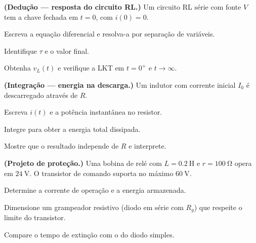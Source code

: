 \blocodesafio
\begin{questao}[4]{}

\textbf{(Dedução --- resposta do circuito RL.)} Um circuito RL série com fonte
$V$ tem a chave fechada em $t=0$, com $i(0)=0$.
\begin{itensq}
\item Escreva a equação diferencial e resolva-a por separação de variáveis.
\item Identifique $\tau$ e o valor final.
\item Obtenha $v_L(t)$ e verifique a LKT em $t=0^{+}$ e $t\to\infty$.
\end{itensq}


\end{questao}
\begin{questao}[4]{}

\textbf{(Integração --- energia na descarga.)} Um indutor com corrente inicial
$I_0$ é descarregado através de $R$.
\begin{itensq}
\item Escreva $i(t)$ e a potência instantânea no resistor.
\item Integre para obter a energia total dissipada.
\item Mostre que o resultado independe de $R$ e interprete.
\end{itensq}


\end{questao}
\begin{questao}[4]{}

\textbf{(Projeto de proteção.)} Uma bobina de relé com $L=\SI{0.2}{\henry}$ e
$r=\SI{100}{\ohm}$ opera em $\SI{24}{\volt}$. O transistor de comando suporta
no máximo $\SI{60}{\volt}$.
\begin{itensq}
\item Determine a corrente de operação e a energia armazenada.
\item Dimensione um grampeador resistivo (diodo em série com $R_g$) que
      respeite o limite do transistor.
\item Compare o tempo de extinção com o do diodo simples.
\end{itensq}


\end{questao}
